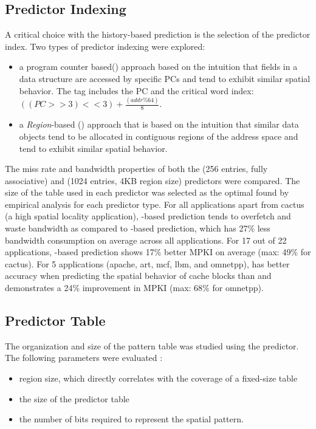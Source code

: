 {{\subsection{Predictor Indexing} 

A critical choice with the history-based prediction is the selection of the predictor index. Two types of predictor indexing were explored:
\begin{itemize}[noitemsep]
  \item a program counter based() approach\cite{chen-hpca-2004} based on the intuition that fields in a data structure are accessed by specific PCs and tend to exhibit similar spatial behavior. The tag includes the PC and the critical word index: $((PC>>3)<<3)+\frac{(addr\%64)}{8}$.
  \item a \textit{Region}-based () approach that is based on the intuition that similar data objects tend to be allocated in contiguous  regions of the address space and tend to exhibit similar spatial behavior. 
\end{itemize}

The miss rate and bandwidth properties of both the  (256 entries, fully associative) and  (1024 entries, 4KB region size) predictors were compared. The size of the table used in each predictor was selected as the optimal found by empirical analysis for each predictor type.  For all applications apart from cactus (a high spatial locality application), -based prediction tends to overfetch and waste bandwidth as compared to -based prediction, which has 27\% less bandwidth consumption on average across all applications. For 17 out of 22 applications, -based prediction shows 17\%  better MPKI on average (max: 49\% for cactus). For 5 applications (apache, art, mcf, lbm, and omnetpp),  has better accuracy when predicting the spatial behavior of cache blocks than  and demonstrates a 24\% improvement in MPKI (max: 68\% for omnetpp).

\subsection{Predictor Table}

The organization and size of the pattern table was studied using the  predictor. The following parameters were evaluated :
\begin{itemize}[noitemsep]
  \item region size, which directly correlates with the coverage of a fixed-size table
  \item the size of the predictor table
  \item the number of bits required to represent the spatial pattern.
\end{itemize}

}}
